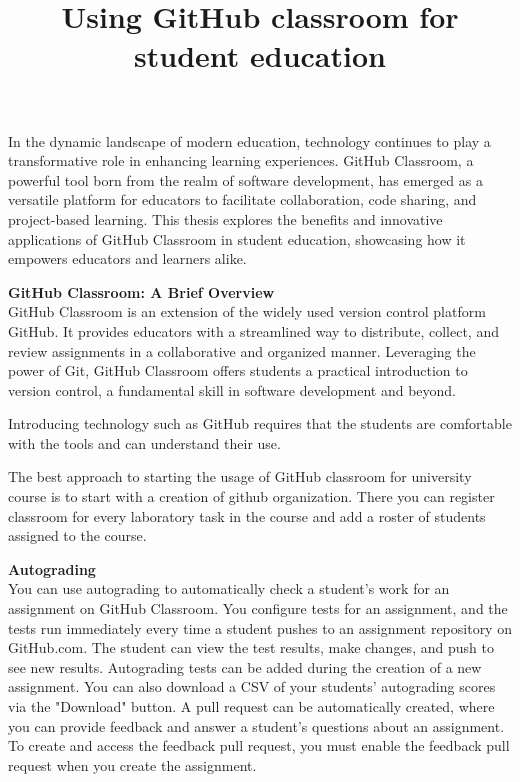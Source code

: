\documentclass[a5paper, 10pt]{article}
\begin{document}
\title{Using GitHub classroom for student education}



\address{Yuriy Fedkovych Chernivtsi National University}


In the dynamic landscape of modern education, technology continues to play a transformative role in enhancing learning experiences. GitHub Classroom, a powerful tool born from the realm of software development, has emerged as a versatile platform for educators to facilitate collaboration, code sharing, and project-based learning. This thesis explores the benefits and innovative applications of GitHub Classroom in student education, showcasing how it empowers educators and learners alike.

\textbf{GitHub Classroom: A Brief Overview} \\
GitHub Classroom is an extension of the widely used version control platform GitHub. It provides educators with a streamlined way to distribute, collect, and review assignments in a collaborative and organized manner. Leveraging the power of Git, GitHub Classroom offers students a practical introduction to version control, a fundamental skill in software development and beyond. \cite{git_classroom}

Introducing technology such as GitHub requires that the students are comfortable with the
tools and can understand their use.

The best approach to starting the usage of GitHub classroom for university course is to start with a creation of github organization. There you can register classroom for every laboratory task in the course and add a roster of students assigned to the course.

\textbf{Autograding} \\
You can use autograding to automatically check a student's work for an assignment on GitHub Classroom. You configure tests for an assignment, and the tests run immediately every time a student pushes to an assignment repository on GitHub.com. The student can view the test results, make changes, and push to see new results. Autograding tests can be added during the creation of a new assignment. You can also download a CSV of your students' autograding scores via the "Download" button. A pull request can be automatically created, where you can provide feedback and answer a student's questions about an assignment. To create and access the feedback pull request, you must enable the feedback pull request when you create the assignment.
\end{document}
